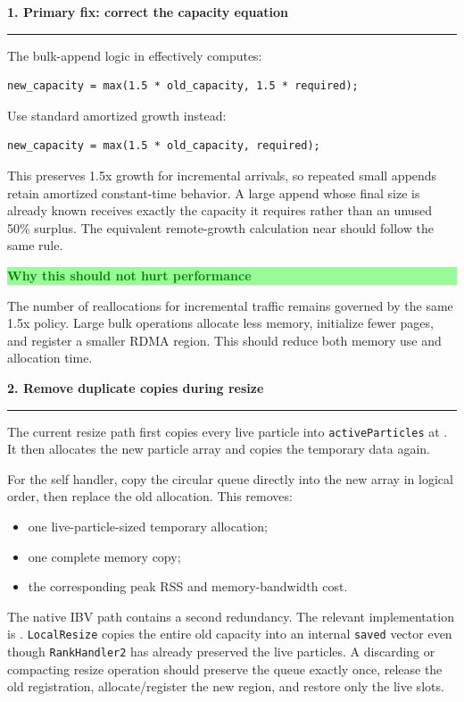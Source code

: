 \documentclass[11pt]{article}
\newcommand{\sectiontitle}[1]{%
  \vspace{4pt}%
  {\Large\bfseries\color{navy} #1}\par
  \vspace{2pt}\textcolor{rule}{\rule{\linewidth}{0.8pt}}\vspace{3pt}
}
\newcommand{\callout}[3]{%
  \noindent\colorbox{#1}{%
    \parbox{\dimexpr\linewidth-2\fboxsep}{%
      \textcolor{#2}{\bfseries #3}%
    }%
  }%
}
\begin{document}
\sectiontitle{1. Primary fix: correct the capacity equation}

The bulk-append logic in
 effectively computes:

\begin{lstlisting}
new_capacity = max(1.5 * old_capacity, 1.5 * required);
\end{lstlisting}

Use standard amortized growth instead:

\begin{lstlisting}
new_capacity = max(1.5 * old_capacity, required);
\end{lstlisting}

This preserves 1.5x growth for incremental arrivals, so repeated small appends
retain amortized constant-time behavior. A large append whose final size is
already known receives exactly the capacity it requires rather than an unused
50\% surplus. The equivalent remote-growth calculation near
 should follow the same rule.

\callout{palegreen}{green}{Why this should not hurt performance}

The number of reallocations for incremental traffic remains governed by the
same 1.5x policy. Large bulk operations allocate less memory, initialize fewer
pages, and register a smaller RDMA region. This should reduce both memory use
and allocation time.

\sectiontitle{2. Remove duplicate copies during resize}

The current resize path first copies every live particle into
\texttt{activeParticles} at . It then allocates the
new particle array and copies the temporary data again.

For the self handler, copy the circular queue directly into the new array in
logical order, then replace the old allocation. This removes:

\begin{itemize}
  \item one live-particle-sized temporary allocation;
  \item one complete memory copy;
  \item the corresponding peak RSS and memory-bandwidth cost.
\end{itemize}

The native IBV path contains a second redundancy. The relevant implementation is
{\small{}.}
\texttt{LocalResize} copies the entire old capacity into an internal
\texttt{saved} vector even
though \texttt{RankHandler2} has already preserved the live particles. A
discarding or compacting resize operation should preserve the queue exactly
once, release the old registration, allocate/register the new region, and
restore only the live slots.
\end{document}
